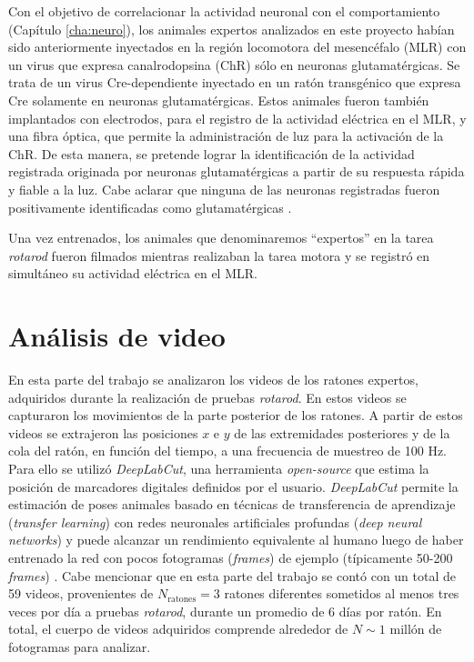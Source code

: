 Con el objetivo de correlacionar la actividad neuronal con el comportamiento (Capítulo \ref{cha:neuro}), los animales expertos analizados en este proyecto habían sido anteriormente inyectados en la región locomotora del mesencéfalo (MLR) con un virus que expresa canalrodopsina (ChR) sólo en neuronas glutamatérgicas. Se trata de un virus Cre-dependiente inyectado en un ratón transgénico que expresa Cre solamente en neuronas glutamatérgicas. Estos animales fueron también implantados con electrodos, para el registro de la actividad eléctrica en el MLR, y una fibra óptica, que permite la administración de luz para la activación de la ChR. De esta manera, se pretende lograr la identificación de la actividad registrada originada por neuronas glutamatérgicas a partir de su respuesta rápida y fiable a la luz. Cabe aclarar que ninguna de las neuronas registradas fueron positivamente identificadas como glutamatérgicas \cite{costa_motor_learning,luft_motor_learning,cardin_optogenetic}.

Una vez entrenados, los animales que denominaremos ``expertos'' en la tarea \textit{rotarod} fueron filmados mientras realizaban la tarea motora y se registró en simultáneo su actividad eléctrica en el MLR.

\section{Análisis de video}\label{sec:videos}

En esta parte del trabajo se analizaron los videos de los ratones expertos, adquiridos durante la realización de pruebas \textit{rotarod}. En estos videos se capturaron los movimientos de la parte posterior de los ratones. A partir de estos videos se extrajeron las posiciones $x$ e $y$ de las extremidades posteriores y de la cola del ratón, en función del tiempo, a una frecuencia de muestreo de 100 Hz. Para ello se utilizó \textit{DeepLabCut}, una herramienta \textit{open-source} que estima la posición de marcadores digitales definidos por el usuario. \textit{DeepLabCut} permite la estimación de poses animales basado en técnicas de transferencia de aprendizaje (\textit{transfer learning}) con redes neuronales artificiales profundas (\textit{deep neural networks}) y puede alcanzar un rendimiento equivalente al humano luego de haber entrenado la red con pocos fotogramas (\textit{frames}) de ejemplo (típicamente 50-200 \textit{frames}) \cite{mathis_deeplabcut}. Cabe mencionar que en esta parte del trabajo se contó con un total de 59 videos, provenientes de $N_{\mathrm{ratones}} = 3$ ratones diferentes sometidos al menos tres veces por día a pruebas \textit{rotarod}, durante un promedio de 6 días por ratón. En total, el cuerpo de videos adquiridos comprende alrededor de $N \sim 1$ millón de fotogramas para analizar.

